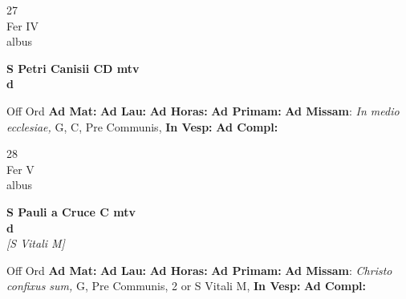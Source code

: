 \documentclass[10pt, openany]{book}
\begin{document}
        \begin{center}
            \begin{minipage}{3.5in}
                \vspace{2em}
                \begin{minipage}{0.5in}
                    {\Huge 27} \\
                    {\normalsize Fer IV} \\
                    {\normalsize albus}
                \end{minipage}
                \begin{minipage}{3.0in}
                    \textbf{ \large S Petri Canisii CD mtv \\
                    \textnormal{\normalsize d}} \\ 
                \end{minipage}
                \begin{justify}Off Ord
                    \textbf{Ad Mat: }
                    \textbf{Ad Lau: }
                    \textbf{Ad Horas: }
                    \textbf{Ad Primam: }\textbf{Ad Missam}: \textit{In medio ecclesiae,} G, C, Pre Communis,  
                    \textbf{In Vesp: }
                    \textbf{Ad Compl: }
                \end{justify}
            \end{minipage}
        \end{center}
    
        \begin{center}
            \begin{minipage}{3.5in}
                \vspace{2em}
                \begin{minipage}{0.5in}
                    {\Huge 28} \\
                    {\normalsize Fer V} \\
                    {\normalsize albus}
                \end{minipage}
                \begin{minipage}{3.0in}
                    \textbf{ \large S Pauli a Cruce C mtv \\
                    \textnormal{\normalsize d}} \\ \textit{[S Vitali M]} \\ 
                \end{minipage}
                \begin{justify}Off Ord
                    \textbf{Ad Mat: }
                    \textbf{Ad Lau: }
                    \textbf{Ad Horas: }
                    \textbf{Ad Primam: }\textbf{Ad Missam}: \textit{Christo confixus sum,} G, Pre Communis, 2 or S Vitali M,  
                    \textbf{In Vesp: }
                    \textbf{Ad Compl: }
                \end{justify}
            \end{minipage}
        \end{center}
    
\end{document}
